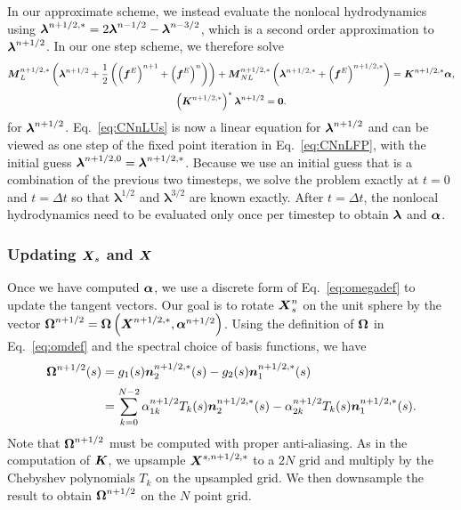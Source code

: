 In our approximate scheme, we instead evaluate the nonlocal hydrodynamics using $\boldsymbol{\lambda}^{n+1/2,*}=2\boldsymbol{\lambda}^{n-1/2}-\boldsymbol{\lambda}^{n-3/2}$, which is a second order approximation to $\boldsymbol{\lambda}^{n+1/2}$. In our one step scheme, we therefore solve
\begin{gather}
\label{eq:CNnLUs}
\boldsymbol{M}_L^{n+1/2,*} \left(\boldsymbol{\lambda}^{n+1/2}+\frac{1}{2}\left(\left(\boldsymbol{f}^E\right)^{n+1}+\left(\boldsymbol{f}^E\right)^{n}\right)\right)+\boldsymbol{M}_{NL}^{n+1/2,*} \left( \boldsymbol{\lambda}^{n+1/2, *}+\left(\boldsymbol{f}^E\right)^{n+1/2,*}\right) = \boldsymbol{K}^{n+1/2,*}\boldsymbol{\alpha},\\[2 pt]
\nonumber
\left(\boldsymbol{K}^{n+1/2,*}\right)^*\boldsymbol{\lambda}^{n+1/2} = \boldsymbol{0}. 
\end{gather}
for $\boldsymbol{\lambda}^{n+1/2}$. Eq.\ \eqref{eq:CNnLUs} is now a linear equation for $\boldsymbol{\lambda}^{n+1/2}$ and can be viewed as one step of the fixed point iteration in Eq.\ \eqref{eq:CNnLFP}, with the initial guess $\boldsymbol{\lambda}^{n+1/2,0}=\boldsymbol{\lambda}^{n+1/2, *}$. Because we use an initial guess that is a combination of the previous two timesteps, we solve the problem exactly at $t=0$ and $t=\Delta t$ so that $\bm{\lambda}^{1/2}$ and $\bm{\lambda}^{3/2}$ are known exactly. After $t=\Delta t$, the nonlocal hydrodynamics need to be evaluated only once per timestep to obtain $\boldsymbol{\lambda}$ and $\boldsymbol{\alpha}$. 

\subsubsection{Updating $\boldsymbol{X}_s$ and $\boldsymbol{X}$}
Once we have computed $\boldsymbol{\alpha}$, we use a discrete form of Eq.\ \eqref{eq:omegadef} to update the tangent vectors. Our goal is to rotate $\boldsymbol{X}_s^n$ on the unit sphere by the vector $\boldsymbol{\Omega}^{n+1/2} =  \boldsymbol{\Omega}\left(\boldsymbol{X}^{n+1/2,*},\boldsymbol{\alpha}^{n+1/2}\right)$. Using the definition of $\boldsymbol{\Omega}$ in Eq.\ \eqref{eq:omdef} and the spectral choice of basis functions, we have 
\begin{align}
\boldsymbol{\Omega}^{n+1/2}(s) & = g_1(s)\boldsymbol{n}_2^{n+1/2,*}(s) -g_2(s) \boldsymbol{n}_1^{n+1/2, *}(s)\\[2 pt]
& = \sum_{k=0}^{N-2} \alpha_{1k}^{n+1/2} T_k(s) \boldsymbol{n}_2^{n+1/2,*}(s) -\alpha_{2k}^{n+1/2} T_k(s) \boldsymbol{n}_1^{n+1/2, *}(s). 
\end{align} 
Note that $\boldsymbol{\Omega}^{n+1/2}$ must be computed with proper anti-aliasing. As in the computation of $\boldsymbol{K}$, we upsample $\boldsymbol{X}^{s,n+1/2,*}$ to a $2N$ grid and multiply by the Chebyshev polynomials $T_k$ on the upsampled grid. We then downsample the result to obtain $\boldsymbol{\Omega}^{n+1/2}$ on the $N$ point grid.

